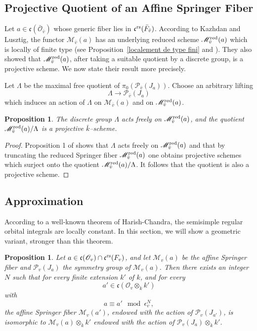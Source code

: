 \documentclass[12pt,english]{smfart}
\numberwithin{equation}{subsection}
\newtheorem{proposition}[equation]{Proposition}
\theoremstyle{remark}
\newcommand\calP{{\mathscr P}}
\newcommand\calM{{\mathscr M}}
\newcommand\calO{{\mathscr O}}
\newcommand\frakc{{\mathfrak c}}
\newcommand\rs{{\rm rs}}
\begin{document}
\subsection{Projective Quotient of an Affine Springer Fiber}

Let $a\in \frakc(\bar\calO_{\bar{v}})$ whose generic fiber lies in $\frakc^\rs(\bar F_{\bar{v}})$. According to Kazhdan and Lusztig, the functor $\calM_{\bar{v}}(a)$ has an underlying reduced scheme $\calM_{\bar{v}}^{\rm red}(a)$ which is locally of finite type (see Proposition~\ref{localement de type fini} and \cite{KL}). They also showed that $\calM_{\bar{v}}^{\rm red}(a)$, after taking a suitable quotient by a discrete group, is a projective scheme. We now state their result more precisely.

Let $\Lambda$ be the maximal free quotient of $\pi_0(\calP_{\bar{v}}(J_a))$. Choose an arbitrary lifting
$$
\Lambda\to \calP_{\bar{v}}(J_a)
$$
which induces an action of $\Lambda$ on $\calM_{\bar{v}}(a)$ and on $\calM_{\bar{v}}^{\rm red}(a)$.

\begin{proposition}\label{quotient projectif}
The discrete group $\Lambda$ acts freely on $\calM_{\bar{v}}^{\rm red}(a)$, and the quotient $\calM_{\bar{v}}^{\rm red}(a)/\Lambda$ is a projective $\bar{k}$--scheme.
\end{proposition}

\begin{proof}
Proposition 1 of \cite[page 138]{KL} shows that $\Lambda$ acts freely on $\calM_{\bar{v}}^{\rm red}(a)$ and that by truncating the reduced Springer fiber $\calM_{\bar{v}}^{\rm red}(a)$ one obtains projective schemes which surject onto the quotient $\calM_{\bar{v}}^{\rm red}(a)/\Lambda$. It follows that the quotient is also a projective scheme.
\end{proof}

\subsection{Approximation}
\label{subsection : approximation}

According to a well-known theorem of Harish-Chandra, the semisimple regular orbital integrals are locally constant. In this section, we will show a geometric variant, stronger than this theorem.

\begin{proposition}\label{HC}
Let $a\in \frakc(\calO_v)\cap \frakc^\rs(F_v)$, and let $\calM_v(a)$ be the affine Springer fiber and $\calP_v(J_a)$ the symmetry group of $\calM_v(a)$. Then there exists an integer $N$ such that for every finite extension $k'$ of $k$, and for every
$$
a'\in\frakc(\calO_v\otimes_k k')
$$
with
$$
a\equiv a' \mod \epsilon_v^N,
$$
the affine Springer fiber $\calM_v(a')$, endowed with the action of $\calP_v(J_{a'})$, is isomorphic to $\calM_v(a)\otimes_k k'$ endowed with the action of $\calP_v(J_a)\otimes_k k'$.
\end{proposition}
\end{document}
